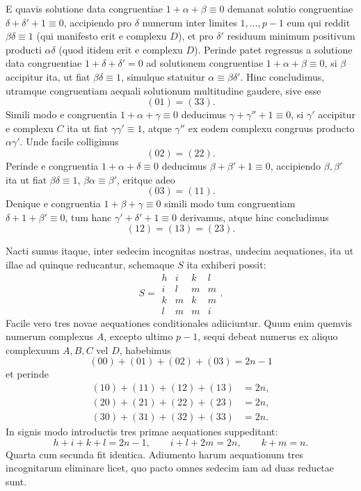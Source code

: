 \documentclass[12pt]{article}
\begin{document}
E quavis solutione data congruentiae $1+\alpha+\beta\equiv0$ demanat solutio congruentiae $\delta+\delta'+1\equiv0$, accipiendo pro $\delta$ numerum inter limites $1,\ldots,p-1$ eum qui reddit $\beta\delta\equiv1$ (qui manifesto erit e complexu $D$), et pro $\delta'$ residuum minimum positivum producti $\alpha\delta$ (quod itidem erit e complexu $D$). Perinde patet regressus a solutione data congruentiae $1+\delta+\delta'=0$ ad solutionem congruentiae $1+\alpha+\beta\equiv0$, si $\beta$ accipitur ita, ut fiat $\beta\delta\equiv1$, simulque statuitur $\alpha\equiv\beta\delta'$. Hinc concludimus, utramque congruentiam aequali solutionum multitudine gaudere, sive esse
\[
(01)=(33).
\]
Simili modo e congruentia $1+\alpha+\gamma\equiv0$ deducimus $\gamma+\gamma''+1\equiv0$, si $\gamma'$ accipitur e complexu $C$ ita ut fiat $\gamma\gamma'\equiv1$, atque $\gamma''$ ex eodem complexu congruus producto $\alpha\gamma'$. Unde facile colligimus
\[
(02)=(22).
\]
Perinde e congruentia $1+\alpha+\delta\equiv0$ deducimus $\beta+\beta'+1\equiv0$, accipiendo $\beta,\beta'$ ita ut fiat $\beta\delta\equiv1$, $\beta\alpha\equiv\beta'$, eritque adeo
\[
(03)=(11).
\]
Denique e congruentia $1+\beta+\gamma\equiv0$ simili modo tum congruentiam $\delta+1+\beta'\equiv0$, tum hanc $\gamma'+\delta'+1\equiv0$ derivamus, atque hinc concludimus
\[
(12)=(13)=(23).
\]

Nacti sumus itaque, inter sedecim incognitas nostras, undecim aequationes, ita ut illae ad quinque reducantur, schemaque $S$ ita exhiberi possit:
\[
S=\begin{array}{rrrr}
h&i&k&l\\
i&l&m&m\\
k&m&k&m\\
l&m&m&i
\end{array}.
\]
Facile vero tres novae aequationes conditionales adiiciuntur. Quum enim quemvis numerum complexus $A$, excepto ultimo $p-1$, sequi debeat numerus ex aliquo complexuum $A,B,C$ vel $D$, habebimus
\[
(00)+(01)+(02)+(03)=2n-1
\]
et perinde
\[
\begin{aligned}
(10)+(11)+(12)+(13)&=2n,\\
(20)+(21)+(22)+(23)&=2n,\\
(30)+(31)+(32)+(33)&=2n.
\end{aligned}
\]
In signis modo introductis tres primae aequationes suppeditant:
\[
h+i+k+l=2n-1,\qquad i+l+2m=2n,\qquad k+m=n.
\]
Quarta cum secunda fit identica. Adiumento harum aequationum tres incognitarum eliminare licet, quo pacto omnes sedecim iam ad duas reductae sunt.
\end{document}
